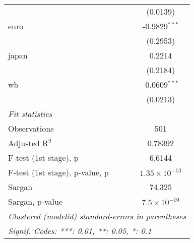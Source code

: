 \begin{tabular}{lc}
                                  & (0.0139)\\   
   euro                           & -0.9829$^{***}$\\   
                                  & (0.2953)\\   
   japan                          & 0.2214\\   
                                  & (0.2184)\\   
   wb                             & -0.0609$^{***}$\\   
                                  & (0.0213)\\   
   \midrule
   \emph{Fit statistics}\\
   Observations                   & 501\\  
   Adjusted R$^2$                 & 0.78392\\  
   F-test (1st stage), p          & 6.6144\\  
   F-test (1st stage), p-value, p & $1.35\times 10^{-13}$\\   
   Sargan                         & 74.325\\  
   Sargan, p-value                & $7.5\times 10^{-10}$\\   
   \midrule \midrule
   \multicolumn{2}{l}{\emph{Clustered (modelid) standard-errors in parentheses}}\\
   \multicolumn{2}{l}{\emph{Signif. Codes: ***: 0.01, **: 0.05, *: 0.1}}\\
\end{tabular}
\par\endgroup


